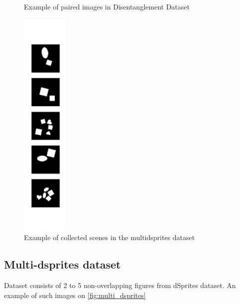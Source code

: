 \documentclass{article}
\begin{document}
\begin{figure}[t]
\begin{minipage}[t]{0.32\textwidth}
            \caption{Example of paired images in Disentanglement Dataset}
            \label{fig:disentanglement_dsprites}
        \end{minipage}\hfill
        \begin{minipage}[t]{0.32\textwidth}
            \centering
            \includegraphics[width=0.20\textwidth]{img/multi-dsprites}
            \caption{Example of collected scenes in the multidsprites dataset}
            \label{fig:multi_dsprites}
        \end{minipage}
    \end{figure}

    \subsection{Multi-dsprites dataset}
    Dataset consists of 2 to 5 non-overlapping figures from dSprites dataset.
    An example of such images on \autoref{fig:multi_dsprites}
\end{document}
